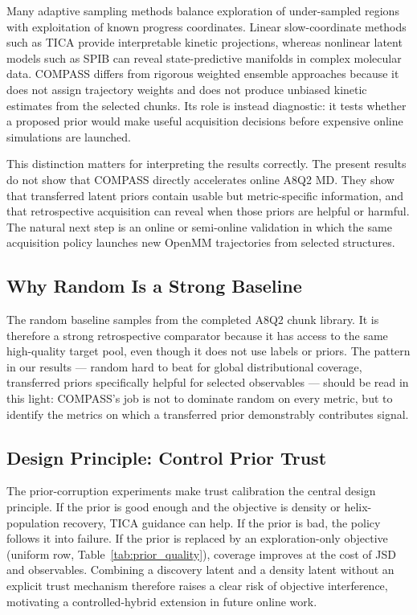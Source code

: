 \documentclass[journal=jctcce,manuscript=article,layout=twocolumn]{achemso}
\begin{document}
Many adaptive sampling methods balance exploration of under-sampled regions with exploitation of known progress coordinates.\cite{shamsi2018reap,yang2024werl,leung2025dlwe} Linear slow-coordinate methods such as TICA provide interpretable kinetic projections, whereas nonlinear latent models such as SPIB can reveal state-predictive manifolds in complex molecular data.\cite{perezhernandez2013tica,wang2021spib} COMPASS differs from rigorous weighted ensemble approaches because it does not assign trajectory weights and does not produce unbiased kinetic estimates from the selected chunks. Its role is instead diagnostic: it tests whether a proposed prior would make useful acquisition decisions before expensive online simulations are launched.

This distinction matters for interpreting the results correctly. The present results do not show that COMPASS directly accelerates online A8Q2 MD. They show that transferred latent priors contain usable but metric-specific information, and that retrospective acquisition can reveal when those priors are helpful or harmful. The natural next step is an online or semi-online validation in which the same acquisition policy launches new OpenMM trajectories from selected structures.

\subsection{Why Random Is a Strong Baseline}

The random baseline samples from the completed A8Q2 chunk library. It is therefore a strong retrospective comparator because it has access to the same high-quality target pool, even though it does not use labels or priors. The pattern in our results --- random hard to beat for global distributional coverage, transferred priors specifically helpful for selected observables --- should be read in this light: COMPASS's job is not to dominate random on every metric, but to identify the metrics on which a transferred prior demonstrably contributes signal.

\subsection{Design Principle: Control Prior Trust}

The prior-corruption experiments make trust calibration the central design principle. If the prior is good enough and the objective is density or helix-population recovery, TICA guidance can help. If the prior is bad, the policy follows it into failure. If the prior is replaced by an exploration-only objective (uniform row, Table~\ref{tab:prior_quality}), coverage improves at the cost of JSD and observables. Combining a discovery latent and a density latent without an explicit trust mechanism therefore raises a clear risk of objective interference, motivating a controlled-hybrid extension in future online work.
\end{document}
